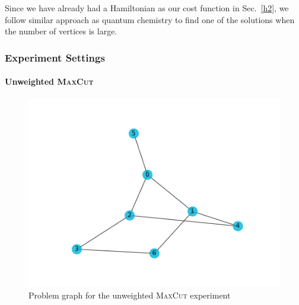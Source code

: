 \documentclass{ieeeaccess}
\begin{document}
  Since we have already had a Hamiltonian as our cost function in Sec.~\ref{h2}, we follow similar approach as quantum chemistry to find one of the solutions when the number of vertices is large.
  
\subsubsection{Experiment Settings}
\paragraph{Unweighted \textsc{MaxCut}}
\begin{figure}[H]
    \centering
    \includegraphics[width=0.8\linewidth]{peiyong_fig_16.pdf}
    \caption{Problem graph for the unweighted \textsc{MaxCut} experiment}
    \label{fig:max_cut_prob}
  \end{figure}
\end{document}
